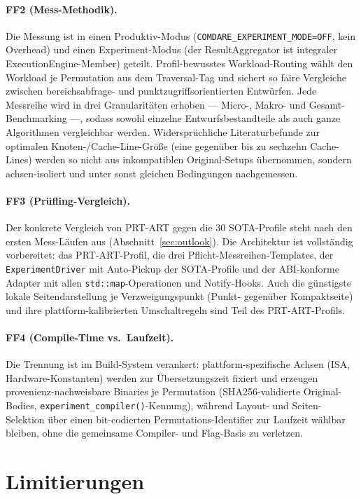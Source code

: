 \paragraph{FF2 (Mess-Methodik).} Die Messung ist in einen Produktiv-Modus
(\texttt{COMDARE\_\allowbreak{}EXPERIMENT\_\allowbreak{}MODE=OFF}, kein Overhead) und einen
Experiment-Modus (der ResultAggregator ist integraler ExecutionEngine-Member) geteilt.
Profil-bewusstes Workload-Routing wählt den Workload je Permutation aus dem Traversal-Tag und
sichert so faire Vergleiche zwischen bereichsabfrage- und punktzugriffsorientierten Entwürfen. Jede
Messreihe wird in drei Granularitäten erhoben --- Micro-, Makro- und Gesamt-Benchmarking ---, sodass
sowohl einzelne Entwurfsbestandteile als auch ganze Algorithmen vergleichbar werden.
Widersprüchliche Literaturbefunde zur optimalen Knoten-/Cache-Line-Größe (eine gegenüber bis zu
sechzehn Cache-Lines) werden so nicht aus inkompatiblen Original-Setups übernommen, sondern
achsen-isoliert und unter sonst gleichen Bedingungen nachgemessen.

\paragraph{FF3 (Prüfling-Vergleich).} Der konkrete Vergleich von PRT-ART gegen die 30
SOTA-Profile steht nach den ersten Mess-Läufen aus (Abschnitt~\ref{sec:outlook}). Die Architektur
ist vollständig vorbereitet: das PRT-ART-Profil, die drei Pflicht-Messreihen-Templates, der
\texttt{ExperimentDriver} mit Auto-Pickup der SOTA-Profile und der ABI-konforme Adapter mit allen
\texttt{std::map}-Operationen und Notify-Hooks. Auch die günstigste lokale Seitendarstellung je
Verzweigungspunkt (Punkt- gegenüber Kompaktseite) und ihre plattform-kalibrierten Umschaltregeln
sind Teil des PRT-ART-Profils.

\paragraph{FF4 (Compile-Time vs.\ Laufzeit).} Die Trennung ist im Build-System verankert:
plattform-spezifische Achsen (ISA, Hardware-Konstanten) werden zur Übersetzungszeit fixiert und
erzeugen provenienz-nachweisbare Binaries je Permutation (SHA256-validierte Original-Bodies,
\texttt{experiment\_compiler()}-Kennung), während Layout- und Seiten-Selektion über einen
bit-codierten Permutations-Identifier zur Laufzeit wählbar bleiben, ohne die gemeinsame Compiler-
und Flag-Basis zu verletzen.

\section{Limitierungen}\label{sec:limitations}

